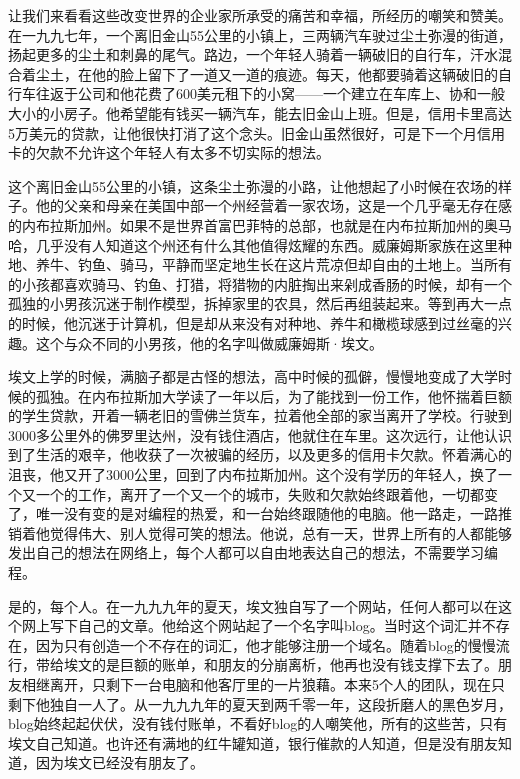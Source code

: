 \documentclass[
  letterpaper,
  DIV=11,
  numbers=noendperiod]{scrreprt}
\begin{document}
让我们来看看这些改变世界的企业家所承受的痛苦和幸福，所经历的嘲笑和赞美。在一九九七年，一个离旧金山55公里的小镇上，三两辆汽车驶过尘土弥漫的街道，扬起更多的尘土和刺鼻的尾气。路边，一个年轻人骑着一辆破旧的自行车，汗水混合着尘土，在他的脸上留下了一道又一道的痕迹。每天，他都要骑着这辆破旧的自行车往返于公司和他花费了600美元租下的小窝------一个建立在车库上、协和一般大小的小房子。他希望能有钱买一辆汽车，能去旧金山上班。但是，信用卡里高达5万美元的贷款，让他很快打消了这个念头。旧金山虽然很好，可是下一个月信用卡的欠款不允许这个年轻人有太多不切实际的想法。

这个离旧金山55公里的小镇，这条尘土弥漫的小路，让他想起了小时候在农场的样子。他的父亲和母亲在美国中部一个州经营着一家农场，这是一个几乎毫无存在感的内布拉斯加州。如果不是世界首富巴菲特的总部，也就是在内布拉斯加州的奥马哈，几乎没有人知道这个州还有什么其他值得炫耀的东西。威廉姆斯家族在这里种地、养牛、钓鱼、骑马，平静而坚定地生长在这片荒凉但却自由的土地上。当所有的小孩都喜欢骑马、钓鱼、打猎，将猎物的内脏掏出来剁成香肠的时候，却有一个孤独的小男孩沉迷于制作模型，拆掉家里的农具，然后再组装起来。等到再大一点的时候，他沉迷于计算机，但是却从来没有对种地、养牛和橄榄球感到过丝毫的兴趣。这个与众不同的小男孩，他的名字叫做威廉姆斯·埃文。

埃文上学的时候，满脑子都是古怪的想法，高中时候的孤僻，慢慢地变成了大学时候的孤独。在内布拉斯加大学读了一年以后，为了能找到一份工作，他怀揣着巨额的学生贷款，开着一辆老旧的雪佛兰货车，拉着他全部的家当离开了学校。行驶到3000多公里外的佛罗里达州，没有钱住酒店，他就住在车里。这次远行，让他认识到了生活的艰辛，他收获了一次被骗的经历，以及更多的信用卡欠款。怀着满心的沮丧，他又开了3000公里，回到了内布拉斯加州。这个没有学历的年轻人，换了一个又一个的工作，离开了一个又一个的城市，失败和欠款始终跟着他，一切都变了，唯一没有变的是对编程的热爱，和一台始终跟随他的电脑。他一路走，一路推销着他觉得伟大、别人觉得可笑的想法。他说，总有一天，世界上所有的人都能够发出自己的想法在网络上，每个人都可以自由地表达自己的想法，不需要学习编程。

是的，每个人。在一九九九年的夏天，埃文独自写了一个网站，任何人都可以在这个网上写下自己的文章。他给这个网站起了一个名字叫blog。当时这个词汇并不存在，因为只有创造一个不存在的词汇，他才能够注册一个域名。随着blog的慢慢流行，带给埃文的是巨额的账单，和朋友的分崩离析，他再也没有钱支撑下去了。朋友相继离开，只剩下一台电脑和他客厅里的一片狼藉。本来5个人的团队，现在只剩下他独自一人了。从一九九九年的夏天到两千零一年，这段折磨人的黑色岁月，blog始终起起伏伏，没有钱付账单，不看好blog的人嘲笑他，所有的这些苦，只有埃文自己知道。也许还有满地的红牛罐知道，银行催款的人知道，但是没有朋友知道，因为埃文已经没有朋友了。
\end{document}
